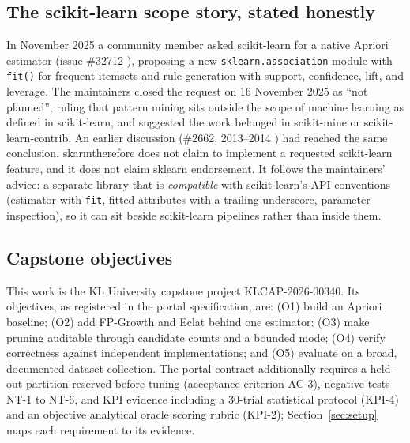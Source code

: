 \documentclass[twocolumn,10pt]{article}
\newcommand{\skarm}{\textsf{skarm}}
\begin{document}
\subsection{The scikit-learn scope story, stated honestly}
In November 2025 a community member asked scikit-learn for a native
Apriori estimator (issue \#32712 \cite{sklearn32712}), proposing a new
\texttt{sklearn.association} module with \texttt{fit()} for frequent
itemsets and rule generation with support, confidence, lift, and
leverage. The maintainers closed the request on 16 November 2025 as
``not planned'', ruling that pattern mining sits outside the scope of
machine learning as defined in scikit-learn, and suggested the work
belonged in scikit-mine or scikit-learn-contrib. An earlier discussion
(\#2662, 2013--2014 \cite{sklearn2662}) had reached the same conclusion. \skarm therefore
does not claim to implement a requested scikit-learn feature, and it
does not claim sklearn endorsement. It follows the maintainers' advice:
a separate library that is \emph{compatible} with scikit-learn's API
conventions (estimator with \texttt{fit}, fitted attributes with a
trailing underscore, parameter inspection), so it can sit beside
scikit-learn pipelines rather than inside them.

\subsection{Capstone objectives}
This work is the KL University capstone project KLCAP-2026-00340. Its
objectives, as registered in the portal specification, are: (O1) build
an Apriori baseline; (O2) add FP-Growth and Eclat behind one estimator;
(O3) make pruning auditable through candidate counts and a bounded
mode; (O4) verify correctness against independent implementations; and
(O5) evaluate on a broad, documented dataset collection. The portal
contract additionally requires a held-out partition reserved before
tuning (acceptance criterion AC-3), negative tests NT-1 to NT-6, and
KPI evidence including a 30-trial statistical protocol (KPI-4) and an
objective analytical oracle scoring rubric (KPI-2); Section~\ref{sec:setup} maps each
requirement to its evidence.
\end{document}
